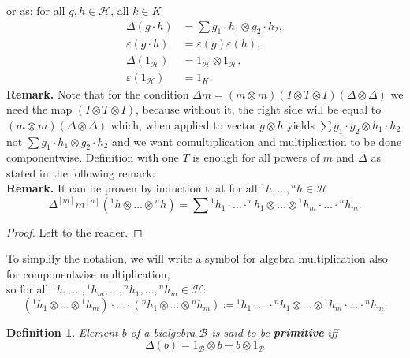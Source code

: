 \documentclass[a4paper, 12pt]{report}
\newtheorem{definition}{Definition}
\begin{document}
or as: for all $g, h \in \mathcal{H}$, all $k \in K$
\begin{align*}
\Delta(g \cdot h) &= \sum g_1 \cdot h_1 \otimes g_2 \cdot h_2, \\
\varepsilon(g \cdot h) &= \varepsilon(g)\varepsilon(h), \\
\Delta (1_\mathcal{H}) &= 1_\mathcal{H} \otimes 1_\mathcal{H}, \\
\varepsilon (1_\mathcal{H}) &= 1_K.
\end{align*}
\textbf{Remark. } Note that for the condition
$\Delta m = (m\otimes m)(I \otimes T \otimes I)(\Delta \otimes \Delta)$
we need the map $(I \otimes T \otimes I)$, because without it, the right side will be equal to
$(m \otimes m)(\Delta \otimes \Delta)$ which, when applied to vector $g \otimes h$ yields
$\displaystyle\sum g_1 \cdot g_2 \otimes h_1 \cdot h_2$ not $\sum g_1 \cdot h_1 \otimes g_2 \cdot h_2$
and we want comultiplication and multiplication to be done componentwise. Definition with
one $T$ is enough for all powers of $m$ and $\Delta$ as stated in the following remark:\\
\textbf{Remark. } It can be proven by induction that for all ${^1h}, \dots, {^nh} \in \mathcal{H}$
\begin{equation}
\Delta^{[m]}m^{[n]}({^1h} \otimes \dots \otimes {^nh}) = \sum {^1h}_1 \cdot \ldots \cdot {^nh}_1
\otimes \dots \otimes {^1h}_m\cdot  \ldots \cdot {^nh}_m.
\end{equation}
\begin{proof}
Left to the reader.
\end{proof}
To simplify the notation, we will write a symbol for algebra multiplication also for componentwise
multiplication, \\ so for all ${^1h}_1, \dots, {^1h}_m, \dots, {^nh}_1, \dots , {^nh}_m \in \mathcal{H}$:
\begin{equation}
({^1h}_1\otimes \dots \otimes {^1h}_m)\cdot \ldots \cdot ({^nh}_1 \otimes \dots \otimes {^nh}_m) \coloneqq
{^1h}_1 \cdot \ldots \cdot {^nh}_1 \otimes \dots \otimes {^1h}_m\cdot  \ldots \cdot {^nh}_m.
\end{equation}
\begin{definition}
Element $b$ of a bialgebra $\mathcal{B}$ is said to be \textbf{primitive} iff
\begin{equation*}
\Delta(b) = 1_\mathcal{B} \otimes b + b \otimes 1_\mathcal{B}
\end{equation*}
\end{definition}
\end{document}
